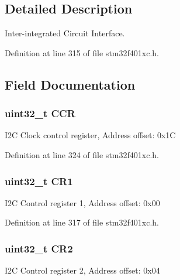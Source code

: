 \subsection{Detailed Description}
Inter-\/integrated Circuit Interface. 

Definition at line 315 of file stm32f401xc.\+h.



\subsection{Field Documentation}
\subsubsection[{\texorpdfstring{C\+CR}{CCR}}]{ uint32\+\_\+t C\+CR}\hypertarget{struct_i2_c___type_def_a5e1322e27c40bf91d172f9673f205c97}{}\label{struct_i2_c___type_def_a5e1322e27c40bf91d172f9673f205c97}
I2C Clock control register, Address offset\+: 0x1C 

Definition at line 324 of file stm32f401xc.\+h.

\subsubsection[{\texorpdfstring{C\+R1}{CR1}}]{ uint32\+\_\+t C\+R1}\hypertarget{struct_i2_c___type_def_ab0ec7102960640751d44e92ddac994f0}{}\label{struct_i2_c___type_def_ab0ec7102960640751d44e92ddac994f0}
I2C Control register 1, Address offset\+: 0x00 

Definition at line 317 of file stm32f401xc.\+h.

\subsubsection[{\texorpdfstring{C\+R2}{CR2}}]{ uint32\+\_\+t C\+R2}\hypertarget{struct_i2_c___type_def_afdfa307571967afb1d97943e982b6586}{}\label{struct_i2_c___type_def_afdfa307571967afb1d97943e982b6586}
I2C Control register 2, Address offset\+: 0x04 

